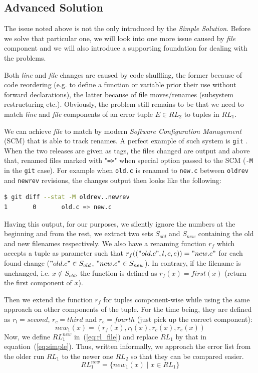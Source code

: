 \documentclass{acm_proc_article-sp}
\begin{document}
\subsection{Advanced Solution}
\label{sec:adv}
The issue noted above is not the only introduced by the \emph{Simple
Solution}. Before we solve that particular one, we will look into one more
issue caused by \textit{file} component and we will also introduce a
supporting foundation for dealing with the problems.

Both \textit{line} and \textit{file} changes are caused by code shuffling, the
former because of code reordering (e.g. to define a function or variable prior
their use without forward declarations), the latter because of file
moves/renames (subsystem restructuring etc.). Obviously, the problem still
remains to be that we need to match \textit{line} and \textit{file} components
of an error tuple $E \in RL_2$ to tuples in $RL_1$.

We can achieve \textit{file} to match by modern \emph{Software Configuration
Management} (SCM) that is able to track renames. A perfect example of such
system is \texttt{git} \cite{git}. When the two releases are given as tags,
the files changed are output and above that, renamed files marked with
"\texttt{=>}" when special option passed to the SCM (\texttt{-M} in the
\texttt{git} case). For example when \texttt{old.c} is renamed to
\texttt{new.c} between \texttt{oldrev} and \texttt{newrev} revisions, the
changes output then looks like the following:
\begin{lstlisting}[language=sh]
$ git diff --stat -M oldrev..newrev
1       0       old.c => new.c
\end{lstlisting}

Having this output, for our purposes, we silently ignore the numbers at the
beginning and from the rest, we extract two sets $S_{old}$ and $S_{new}$
containing the old and new filenames respectively. We also have a renaming
function $r_f$ which accepts a tuple as parameter such that
$r_f(("old.c",l,c,e))="new.c"$ for each found change ($"old.c" \in S_{old}$,
$"new.c" \in S_{new}$). In contrary, if the filename is unchanged, i.e.  $x
\notin S_{old}$, the function is defined as $r_f(x)=first(x)$ (return the
first component of $x$).

Then we extend the function $r_f$ for tuples component-wise while using the
same approach on other components of the tuple. For the time being, they are
defined as $r_l=second$, $r_c=third$ and $r_e=fourth$ (just pick up the
correct component):
\begin{displaymath}
new_1(x) = (r_f(x),r_l(x),r_c(x),r_e(x))
\end{displaymath}
Now, we define $RL_1^{new}$ in~(\ref{eq:rl_file}) and replace $RL_1$ by that
in equation~(\ref{eq:simple}). Thus, written informally, we approach the error
list from the older run $RL_1$ to the newer one $RL_2$ so that they can be
compared easier.
\begin{equation} \label{eq:rl_file}
RL_1^{new} = \{new_1(x) \mid x \in RL_1\}
\end{equation}
\end{document}
